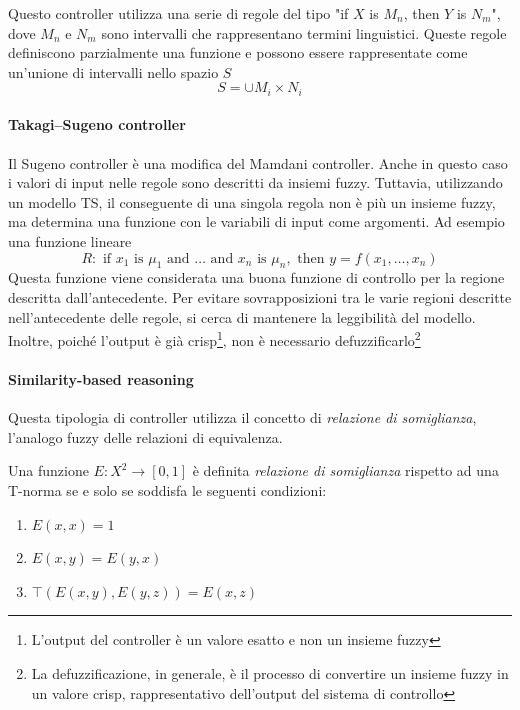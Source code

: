 Questo controller utilizza una serie di regole del tipo "if $X$ is $M_n$, then $Y$ is $N_m$", dove $M_n$ e $N_m$ sono intervalli che rappresentano termini linguistici. Queste regole definiscono parzialmente una funzione e possono essere rappresentate come un'unione di intervalli nello spazio $S$
$$S = \cup M_i \times N_i$$

\paragraph{Takagi–Sugeno controller}
Il Sugeno controller è una modifica del Mamdani controller. Anche in questo caso i valori di input nelle regole sono descritti da insiemi fuzzy. Tuttavia, utilizzando un modello TS, il conseguente di una singola regola non è più un insieme fuzzy, ma determina una funzione con le variabili di input come argomenti. Ad esempio una funzione lineare
$$R : \text{ if } x_1 \text{ is } \mu_1 \text{ and } \dots \text{ and } x_n \text{ is } \mu_n, \text{ then } y = f(x_1,\dots,x_n)$$
Questa funzione viene considerata una buona funzione di controllo per la regione descritta dall'antecedente. Per evitare sovrapposizioni tra le varie regioni descritte nell'antecedente delle regole, si cerca di mantenere la leggibilità del modello. Inoltre, poiché l'output è già crisp\footnote{L'output del controller è un valore esatto e non un insieme fuzzy}, non è necessario defuzzificarlo\footnote{La defuzzificazione, in generale, è il processo di convertire un insieme fuzzy in un valore crisp, rappresentativo dell'output del sistema di controllo}

\paragraph{Similarity-based reasoning}
Questa tipologia di controller utilizza il concetto di \textit{relazione di somiglianza}, l’analogo fuzzy delle relazioni di equivalenza.

\begin{definizione}
    Una funzione $E: X^2 \to [0,1]$ è definita \textit{relazione di somiglianza} rispetto ad una T-norma se e solo se soddisfa le seguenti condizioni:
    \begin{enumerate}
        \item{$E(x,x) = 1$}
        \item{$E(x,y) = E(y,x)$}
        \item{$\top (E(x,y),E(y,z)) = E(x,z)$}
    \end{enumerate} 
\end{definizione}


